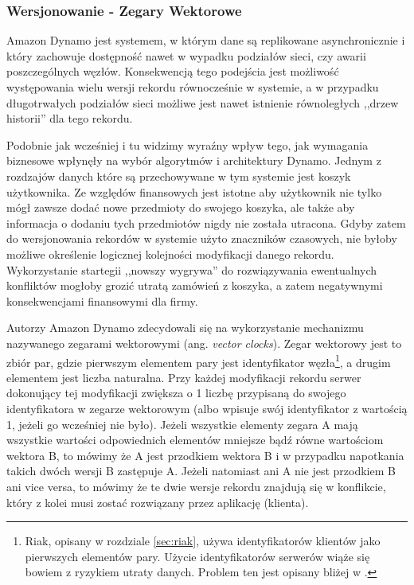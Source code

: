 \subsubsection*{Wersjonowanie - Zegary Wektorowe}

Amazon Dynamo jest systemem, w którym dane są replikowane asynchronicznie i który zachowuje dostępność nawet w wypadku podziałów sieci, czy awarii poszczególnych węzłów.
Konsekwencją tego podejścia jest możliwość występowania wielu wersji rekordu równocześnie w systemie, a w przypadku długotrwałych podziałów sieci możliwe jest nawet istnienie równoległych ,,drzew historii'' dla tego rekordu.

Podobnie jak wcześniej i tu widzimy wyraźny wpływ tego, jak wymagania biznesowe wpłynęły na wybór algorytmów i architektury Dynamo.
Jednym z rozdzajów danych które są przechowywane w tym systemie jest koszyk użytkownika.
Ze względów finansowych jest istotne aby użytkownik nie tylko mógł zawsze dodać nowe przedmioty do swojego koszyka, ale także aby informacja o dodaniu tych przedmiotów nigdy nie została utracona.
Gdyby zatem do wersjonowania rekordów w systemie użyto znaczników czasowych, nie byłoby możliwe określenie logicznej kolejności modyfikacji danego rekordu.
Wykorzystanie startegii ,,nowszy wygrywa'' do rozwiązywania ewentualnych konfliktów mogłoby grozić utratą zamówień z koszyka, a zatem negatywnymi konsekwencjami finansowymi dla firmy.

Autorzy Amazon Dynamo zdecydowali się na wykorzystanie mechanizmu nazywanego zegarami wektorowymi (ang. \emph{vector clocks}).
Zegar wektorowy jest to zbiór par, gdzie pierwszym elementem pary jest identyfikator węzła\footnote{Riak, opisany w rozdziale \ref{sec:riak}, używa identyfikatorów klientów jako pierwszych elementów pary. Użycie identyfikatorów serwerów wiąże się bowiem z ryzykiem utraty danych. Problem ten jest opisany bliżej w \cite{basho-vector-clocks-hard}.}, a drugim elementem jest liczba naturalna.
Przy każdej modyfikacji rekordu serwer dokonujący tej modyfikacji zwiększa o 1 liczbę przypisaną do swojego identyfikatora w zegarze wektorowym (albo wpisuje swój identyfikator z wartością 1, jeżeli go wcześniej nie było).
Jeżeli wszystkie elementy zegara A mają wszystkie wartości odpowiednich elementów mniejsze bądź równe wartościom wektora B, to mówimy że A jest przodkiem wektora B i w przypadku napotkania takich dwóch wersji B zastępuje A.
Jeżeli natomiast ani A nie jest przodkiem B ani vice versa, to mówimy że te dwie wersje rekordu znajdują się w konflikcie, który z kolei musi zostać rozwiązany przez aplikację (klienta).

